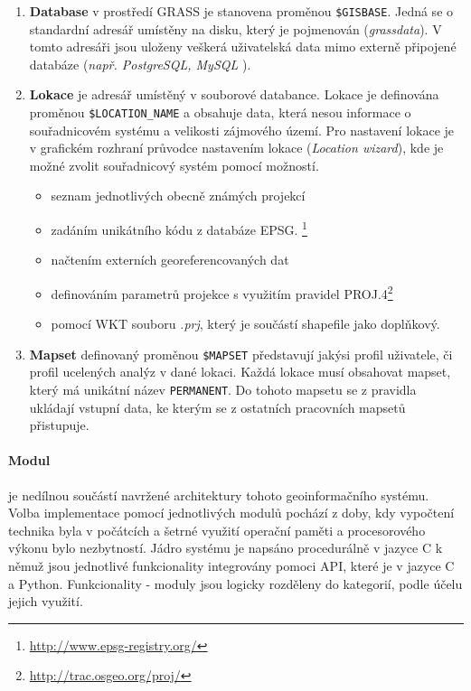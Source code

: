 \documentclass[a4paper,12pt,oneside]{report}
\begin{document}
\begin{enumerate}
\item \textbf{Database} v prostředí GRASS je stanovena proměnou \texttt{\$GISBASE}. Jedná se o standardní adresář umístěny na disku, který je pojmenován (\textit{grassdata}). V tomto adresáři jsou uloženy veškerá uživatelská data mimo externě připojené databáze (\textit{např. PostgreSQL, MySQL }).

\item \textbf{Lokace} je adresář umístěný v souborové databance. Lokace je definována proměnou   \texttt{\$LOCATION\_NAME}
a obsahuje data, která nesou informace o souřadnicovém systému a velikosti zájmového území. Pro nastavení lokace je v grafickém rozhraní průvodce nastavením lokace (\textit{Location wizard}), kde je možné zvolit souřadnicový systém pomocí možností.
\begin{itemize}
\item seznam jednotlivých obecně známých projekcí 
\item zadáním unikátního kódu z databáze \acs{EPSG}. \footnote{\url{http://www.epsg-registry.org/}}
\item načtením externích georeferencovaných dat
\item definováním parametrů projekce s využitím pravidel PROJ.4\footnote{\url{http://trac.osgeo.org/proj/}}
\item pomocí \ac{WKT} souboru \emph{.prj}, který je součástí shapefile jako doplňkový.
\end{itemize}

\item \textbf{Mapset} definovaný proměnou \texttt{\$MAPSET} představují jakýsi profil uživatele, či profil ucelených analýz  v dané lokaci. Každá lokace musí obsahovat mapset, který má unikátní název \texttt{PERMANENT}. Do tohoto mapsetu se z pravidla ukládají vstupní data, ke kterým se z ostatních pracovních mapsetů přistupuje.
\end{enumerate}



\paragraph*{Modul} je nedílnou součástí navržené architektury tohoto geoinformačního systému. Volba implementace pomocí jednotlivých modulů pochází z doby, kdy vypočtení technika byla v počátcích a šetrné využití operační paměti a procesorového výkonu bylo nezbytností. Jádro systému je napsáno procedurálně v jazyce C k němuž jsou  jednotlivé funkcionality integrovány pomoci \acs{API}, které je v jazyce C a Python. Funkcionality - moduly jsou logicky rozděleny do kategorií, podle účelu jejich využití.
\end{document}
